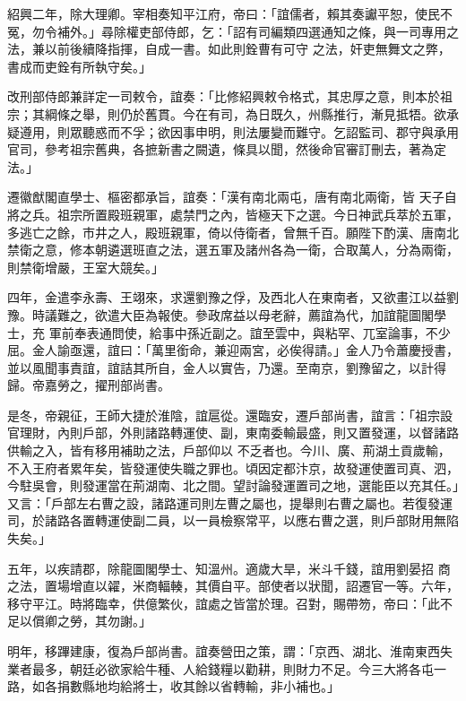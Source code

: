 \begin{pinyinscope}
 紹興二年，除大理卿。宰相奏知平江府，帝曰：「誼儒者，賴其奏讞平恕，使民不冤，勿令補外。」尋除權吏部侍郎，乞：「詔有司編類四選通知之條，與一司專用之法，兼以前後續降指揮，自成一書。如此則銓曹有可守
 之法，奸吏無舞文之弊，書成而吏銓有所執守矣。」



 改刑部侍郎兼詳定一司敕令，誼奏：「比修紹興敕令格式，其忠厚之意，則本於祖宗；其綱條之舉，則仍於舊貫。今在有司，為日既久，州縣推行，漸見抵牾。欲承疑遵用，則眾聽惑而不孚；欲因事申明，則法屢變而難守。乞詔監司、郡守與承用官司，參考祖宗舊典，各摭新書之闕遺，條具以聞，然後命官審訂刪去，著為定法。」



 遷徽猷閣直學士、樞密都承旨，誼奏：「漢有南北兩屯，唐有南北兩衛，皆
 天子自將之兵。祖宗所置殿班親軍，處禁門之內，皆極天下之選。今日神武兵萃於五軍，多逃亡之餘，市井之人，殿班親軍，倚以侍衛者，曾無千百。願陛下酌漢、唐南北禁衛之意，修本朝遴選班直之法，選五軍及諸州各為一衛，合取萬人，分為兩衛，則禁衛增嚴，王室大競矣。」



 四年，金遣李永壽、王翊來，求還劉豫之俘，及西北人在東南者，又欲畫江以益劉豫。時議難之，欲遣大臣為報使。參政席益以母老辭，薦誼為代，加誼龍圖閣學士，充
 軍前奉表通問使，給事中孫近副之。誼至雲中，與粘罕、兀室論事，不少屈。金人諭亟還，誼曰：「萬里銜命，兼迎兩宮，必俟得請。」金人乃令蕭慶授書，並以風聞事責誼，誼詰其所自，金人以實告，乃還。至南京，劉豫留之，以計得歸。帝嘉勞之，擢刑部尚書。



 是冬，帝親征，王師大捷於淮陰，誼扈從。還臨安，遷戶部尚書，誼言：「祖宗設官理財，內則戶部，外則諸路轉運使、副，東南委輸最盛，則又置發運，以督諸路供輸之入，皆有移用補助之法，戶部仰以
 不乏者也。今川、廣、荊湖土貢歲輸，不入王府者累年矣，皆發運使失職之罪也。頃因定都汴京，故發運使置司真、泗，今駐吳會，則發運當在荊湖南、北之間。望討論發運置司之地，選能臣以充其任。」又言：「戶部左右曹之設，諸路運司則左曹之屬也，提舉則右曹之屬也。若復發運司，於諸路各置轉運使副二員，以一員檢察常平，以應右曹之選，則戶部財用無陷失矣。」



 五年，以疾請郡，除龍圖閣學士、知溫州。適歲大旱，米斗千錢，誼用劉晏招
 商之法，置場增直以糴，米商輻輳，其價自平。部使者以狀聞，詔遷官一等。六年，移守平江。時將臨幸，供億繁伙，誼處之皆當於理。召對，賜帶笏，帝曰：「此不足以償卿之勞，其勿謝。」



 明年，移蹕建康，復為戶部尚書。誼奏營田之策，謂：「京西、湖北、淮南東西失業者最多，朝廷必欲家給牛種、人給錢糧以勸耕，則財力不足。今三大將各屯一路，如各捐數縣地均給將士，收其餘以省轉輸，非小補也。」




\end{pinyinscope}
